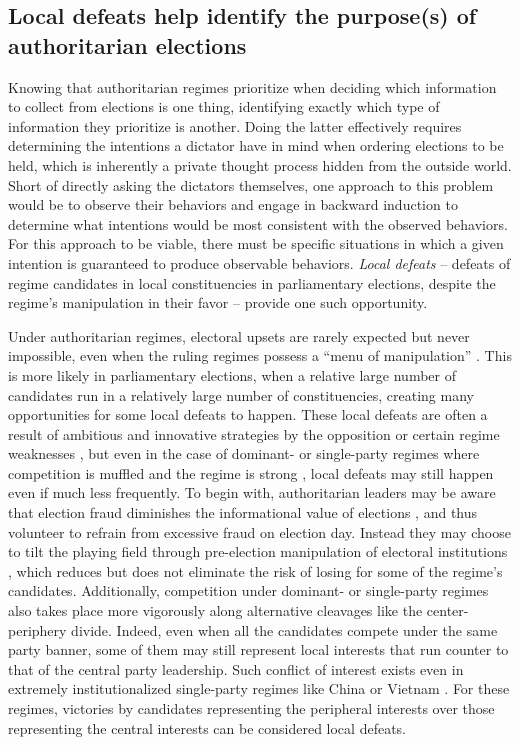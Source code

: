 \documentclass[12pt]{article}
\newcommand{\1}{\mathbbm{1}}
\begin{document}
\subsection{Local defeats help identify the purpose(s) of authoritarian elections}
\label{sec:theory_local_defeat}

Knowing that authoritarian regimes prioritize when deciding which information to collect from elections is one thing, identifying exactly which type of information they prioritize is another. Doing the latter effectively requires determining the intentions a dictator have in mind when ordering elections to be held, which is inherently a private thought process hidden from the outside world. Short of directly asking the dictators themselves, one approach to this problem would be to observe their behaviors and engage in backward induction to determine what intentions would be most consistent with the observed behaviors. For this approach to be viable, there must be specific situations in which a given intention is guaranteed to produce observable behaviors. \textit{Local defeats} -- defeats of regime candidates in local constituencies in parliamentary elections, despite the regime's manipulation in their favor -- provide one such opportunity.

Under authoritarian regimes, electoral upsets are rarely expected but never impossible, even when the ruling regimes possess a ``menu of manipulation'' \citep{Schedler2002menu}. This is more likely in parliamentary elections, when a relative large number of candidates run in a relatively large number of constituencies, creating many opportunities for some local defeats to happen. These local defeats are often a result of ambitious and innovative strategies by the opposition \citep{BunceWolchik2010} or certain regime weaknesses \citep{LevistkyWay2010}, but even in the case of dominant- or single-party regimes where competition is muffled \citep{Schedler2002} and the regime is strong \citep{BunceWolchik2010}, local defeats may still happen even if much less frequently. To begin with, authoritarian leaders may be aware that election fraud diminishes the informational value of elections \citep{Wintrobe2000}, and thus volunteer to refrain from excessive fraud on election day. Instead they may choose to tilt the playing field through pre-election manipulation of electoral institutions \citep{DiazMagaloni2001, Pepinsky2009, MaleskySchuler2011}, which reduces but does not eliminate the risk of losing for some of the regime's candidates. Additionally, competition under dominant- or single-party regimes also takes place more vigorously along alternative cleavages like the center-periphery divide. Indeed, even when all the candidates compete under the same party banner, some of them may still represent local interests that run counter to that of the central party leadership. Such conflict of interest exists even in extremely institutionalized single-party regimes like China \citep{Manion2014} or Vietnam \citep{MaleskySchuler2011}. For these regimes, victories by candidates representing the peripheral interests over those representing the central interests can be considered local defeats.
	
\end{document}
